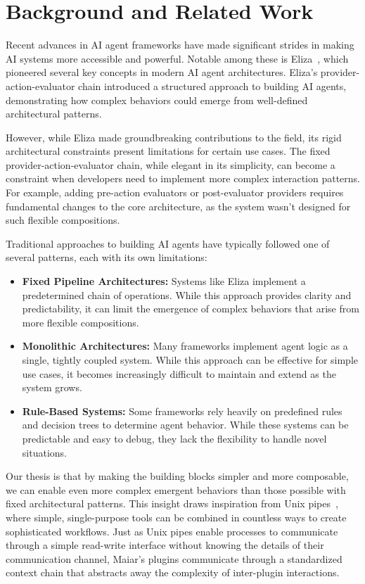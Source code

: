 \documentclass[12pt]{article}
\begin{document}
\section{Background and Related Work}
Recent advances in AI agent frameworks have made significant strides in making AI systems more accessible and powerful. Notable among these is Eliza~\cite{eliza}, which pioneered several key concepts in modern AI agent architectures. Eliza's provider-action-evaluator chain introduced a structured approach to building AI agents, demonstrating how complex behaviors could emerge from well-defined architectural patterns.

However, while Eliza made groundbreaking contributions to the field, its rigid architectural constraints present limitations for certain use cases. The fixed provider-action-evaluator chain, while elegant in its simplicity, can become a constraint when developers need to implement more complex interaction patterns. For example, adding pre-action evaluators or post-evaluator providers requires fundamental changes to the core architecture, as the system wasn't designed for such flexible compositions.

Traditional approaches to building AI agents have typically followed one of several patterns, each with its own limitations:

\begin{itemize}
    \item \textbf{Fixed Pipeline Architectures:} Systems like Eliza implement a predetermined chain of operations. While this approach provides clarity and predictability, it can limit the emergence of complex behaviors that arise from more flexible compositions.
    
    \item \textbf{Monolithic Architectures:} Many frameworks implement agent logic as a single, tightly coupled system. While this approach can be effective for simple use cases, it becomes increasingly difficult to maintain and extend as the system grows.
    
    \item \textbf{Rule-Based Systems:} Some frameworks rely heavily on predefined rules and decision trees to determine agent behavior. While these systems can be predictable and easy to debug, they lack the flexibility to handle novel situations.
\end{itemize}

Our thesis is that by making the building blocks simpler and more composable, we can enable even more complex emergent behaviors than those possible with fixed architectural patterns. This insight draws inspiration from Unix pipes~\cite{unix}, where simple, single-purpose tools can be combined in countless ways to create sophisticated workflows. Just as Unix pipes enable processes to communicate through a simple read-write interface without knowing the details of their communication channel, Maiar's plugins communicate through a standardized context chain that abstracts away the complexity of inter-plugin interactions.
\end{document}
